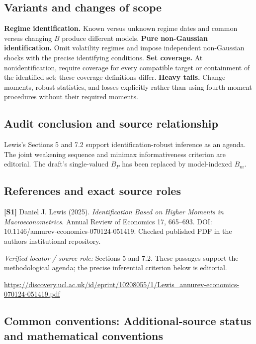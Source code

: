 \documentclass[11pt,a4paper]{article}
\begin{document}
\subsection*{Variants and changes of scope}

\textbf{Regime identification.} Known versus unknown regime dates and common versus changing $B$ produce different models. \textbf{Pure non-Gaussian identification.} Omit volatility regimes and impose independent non-Gaussian shocks with the precise identifying conditions. \textbf{Set coverage.} At nonidentification, require coverage for every compatible target or containment of the identified set; these coverage definitions differ. \textbf{Heavy tails.} Change moments, robust statistics, and losses explicitly rather than using fourth-moment procedures without their required moments.

\subsection*{Audit conclusion and source relationship}

Lewis's Sections 5 and 7.2 support identification-robust inference as an agenda. The joint weakening sequence and minimax informativeness criterion are editorial. The draft's single-valued $B_P$ has been replaced by model-indexed $B_m$.

\subsection*{References and exact source roles}

{\footnotesize\raggedright
\par\noindent\textbf{[S1]} Daniel J. Lewis (2025). \emph{Identification Based on Higher Moments in Macroeconometrics}. Annual Review of Economics 17, 665--693. DOI: 10.1146/annurev-economics-070124-051419. Checked published PDF in the author\textquotesingle s institutional repository.\par \textit{Verified locator / source role:} Sections 5 and 7.2. These passages support the methodological agenda; the precise inferential criterion below is editorial.\par \url{https://discovery.ucl.ac.uk/id/eprint/10208055/1/Lewis_annurev-economics-070124-051419.pdf}\par\smallskip
}

\subsection*{Common conventions: Additional-source status and mathematical conventions}
\end{document}
